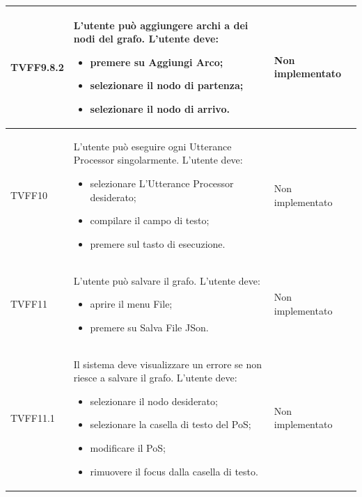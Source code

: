 \documentclass[openany,12pt,a4paper]{report}
\begin{document}
\begin{longtable}{| p{2cm} |p{5cm} | p{2.5cm} |}
	\newline TVFF9.8.2&
	\newline L'utente può aggiungere archi a dei nodi del grafo. L'utente deve:
	\begin{itemize}
		\item premere su Aggiungi Arco;
		\item selezionare il nodo di partenza;
		\item selezionare il nodo di arrivo.
	\end{itemize}&
	\newline Non implementato
	\\[1em]
	\hline
	
	\newline TVFF10&
	\newline L'utente può eseguire ogni Utterance Processor singolarmente. L'utente deve:
	\begin{itemize}
		\item selezionare L'Utterance Processor desiderato;
		\item compilare il campo di testo;
		\item premere sul tasto di esecuzione.
	\end{itemize}&
	\newline Non implementato
	\\[1em]
	\hline
	
	
	\newline TVFF11&
	\newline L'utente può salvare il grafo. L'utente deve:
	\begin{itemize}
		\item aprire il menu File;
		\item premere su Salva File JSon.
	\end{itemize}&
	\newline Non implementato
	\\[1em]
	\hline	
	
	\newline TVFF11.1&
	\newline Il sistema deve visualizzare un errore se non riesce a salvare il grafo. L'utente deve:
	\begin{itemize}
		\item selezionare il nodo desiderato;
		\item selezionare la casella di testo del PoS;
		\item modificare il PoS;
		\item rimuovere il focus dalla casella di testo.
	\end{itemize}&
	\newline Non implementato 
	\\[1em]
	\hline
	

\end{longtable}
\end{document}
